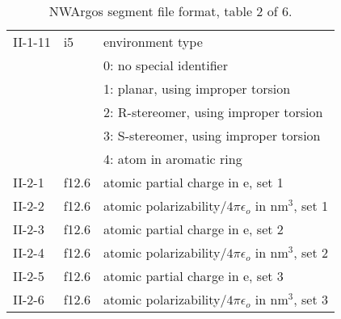 \begin{table}[htbp]
\begin{tabular*}{150mm}{p{12mm}p{12mm}l}
II-1-11 & i5     & environment type\\
        &        & 0: no special identifier\\
        &        & 1: planar, using improper torsion\\
        &        & 2: R-stereomer, using improper torsion\\
        &        & 3: S-stereomer, using improper torsion\\
        &        & 4: atom in aromatic ring\\
II-2-1  & f12.6  & atomic partial charge in e, set 1\\
II-2-2  & f12.6  & atomic polarizability/$4\pi\epsilon_o$ in nm$^3$, set 1\\
II-2-3  & f12.6  & atomic partial charge in e, set 2\\
II-2-4  & f12.6  & atomic polarizability/$4\pi\epsilon_o$ in nm$^3$, set 2\\
II-2-5  & f12.6  & atomic partial charge in e, set 3\\
II-2-6  & f12.6  & atomic polarizability/$4\pi\epsilon_o$ in nm$^3$, set 3\\
\hline
\end{tabular*}

\caption{NWArgos segment file format, table 2 of 6.}
\end{table}


